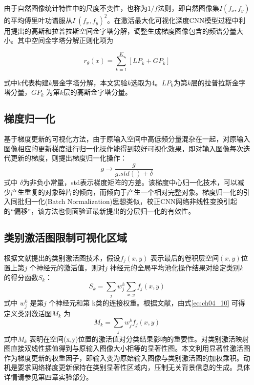 由于自然图像统计特性中的尺度不变性，也称为$1/f$法则\citep{VanderSchaaf1996a}，即自然图像集$I(f_{x},f_{y})$ 的平均傅里叶功谱服从$I~(f_{x},f_{y})^2$。在激活最大化可视化深度CNN模型过程中利用提出的高斯和拉普拉斯空间金字塔分解，调整生成梯度图像包含的频谱分量大小。其中空间金字塔分解正则化项为

\begin{equation} \label{eq:ch04_08}
       r_{\theta}(x)= \sum_{k=1}^{K}[LP_{k}+GP_{k}]
\end{equation}

式中k代表构建$k$层金字塔分解，本文实验$k$选取为4。$LP_{k}$为第$k$层的拉普拉斯金字塔分量，$GP_{k}$ 为第$k$层的高斯金字塔分量。


\subsection{梯度归一化}
  
基于梯度更新的可视化方法，由于原输入空间中高低频分量混杂在一起，对原输入图像相应的更新梯度进行归一化操作能得到较好可视化效果，即对输入图像每次迭代更新的梯度，则提出梯度归一化操作：   
\begin{equation} \label{eq:ch04_09}
       g \rightarrow \frac{g}{g.std()+\delta}
\end{equation} 
式中 $\delta$为非负小常量，std表示梯度矩阵的方差。该梯度中心归一化技术，可以减少产生重复的对象碎片的倾向，而倾向于产生一个相对完整对象。梯度归一化的引入同批归一化(Batch Normalization)思想类似，校正CNN网络非线性变换引起的“偏移”，该方法也侧面验证最新提出的分层归一化\citep{Ioffe2014Batch}的有效性。
\subsection{类别激活图限制可视化区域}
根据文献提出的类别激活图技术，假设$f_{j}(x,y)$  表示最后的卷积层空间$(x,y)$位置上第$j$ 个神经元的激活值，则对$j$ 神经元的全局平均池化操作结果对给定类别$k$的得分函数$S_{k}$：
\begin{equation} \label{eq:ch04_10}
      S_{k}=\sum _{j} w_{j}^{k} \sum _{x,y}f_{j}(x,y)
\end{equation}
式中 $w_{j}^{k}$ 是第$j$ 个神经元和第 k类的连接权重。根据文献，由式\ref{eq:ch04_10} 可得定义类别激活图$M_{k}$ 为	
\begin{equation} \label{eq:ch04_11}
      M_{k}=\sum _{j} w_{j}^{k}f_{j}(x,y)
\end{equation}
式中$M_{k}$ 表明在空间(x,y)位置的激活值对分类结果影响的重要性。对类别激活映射图直接双线性插值得到与原输入图像大小相等的显著性图。本文利用显著性激活图作为梯度更新的权重因子，即输入变为原始输入图像与类别激活图的加权乘积。动机是要求网络梯度更新保持在类别显著性区域内，压制无关背景信息的生成。具体详情请参见第四章实验部分。
